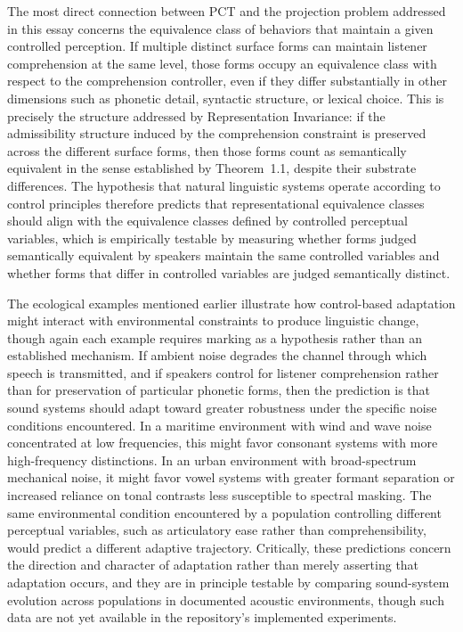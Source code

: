 The most direct connection between PCT and the projection problem addressed in this essay concerns the equivalence class of behaviors that maintain a given controlled perception. If multiple distinct surface forms can maintain listener comprehension at the same level, those forms occupy an equivalence class with respect to the comprehension controller, even if they differ substantially in other dimensions such as phonetic detail, syntactic structure, or lexical choice. This is precisely the structure addressed by Representation Invariance: if the admissibility structure induced by the comprehension constraint is preserved across the different surface forms, then those forms count as semantically equivalent in the sense established by Theorem~1.1, despite their substrate differences. The hypothesis that natural linguistic systems operate according to control principles therefore predicts that representational equivalence classes should align with the equivalence classes defined by controlled perceptual variables, which is empirically testable by measuring whether forms judged semantically equivalent by speakers maintain the same controlled variables and whether forms that differ in controlled variables are judged semantically distinct.

The ecological examples mentioned earlier illustrate how control-based adaptation might interact with environmental constraints to produce linguistic change, though again each example requires marking as a hypothesis rather than an established mechanism. If ambient noise degrades the channel through which speech is transmitted, and if speakers control for listener comprehension rather than for preservation of particular phonetic forms, then the prediction is that sound systems should adapt toward greater robustness under the specific noise conditions encountered. In a maritime environment with wind and wave noise concentrated at low frequencies, this might favor consonant systems with more high-frequency distinctions. In an urban environment with broad-spectrum mechanical noise, it might favor vowel systems with greater formant separation or increased reliance on tonal contrasts less susceptible to spectral masking. The same environmental condition encountered by a population controlling different perceptual variables, such as articulatory ease rather than comprehensibility, would predict a different adaptive trajectory. Critically, these predictions concern the direction and character of adaptation rather than merely asserting that adaptation occurs, and they are in principle testable by comparing sound-system evolution across populations in documented acoustic environments, though such data are not yet available in the repository's implemented experiments.

